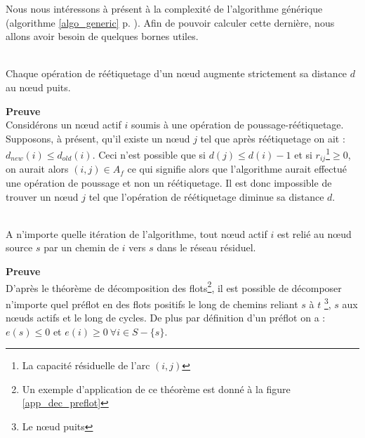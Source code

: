 Nous nous intéressons à présent à la complexité de l'algorithme générique (algorithme
\ref{algo_generic} p. \pageref{algo_generic}). Afin de pouvoir calculer cette dernière, nous allons
avoir besoin de quelques bornes utiles.

\begin{lemma} ~\\
	\label{increase_distance}
	Chaque opération de réétiquetage d'un n\oe ud augmente strictement sa distance $d$ au n\oe ud puits.
\end{lemma}

\textbf{Preuve} \\
Considérons un n\oe ud actif $i$ soumis à une opération de poussage-réétiquetage. Supposons, à présent,
qu'il existe un n\oe ud $j$ tel que après réétiquetage on ait : $d_{new}(i) \leq d_{old}(i)$. Ceci
n'est possible que si $d(j) \leq d(i) - 1$ et si $r_{ij}$\footnote{La capacité résiduelle de l'arc
$(i,j)$}$\geq 0$, on aurait alors $(i,j) \in A_f$ ce qui signifie alors que l'algorithme aurait
effectué une opération de poussage et non un réétiquetage. Il est donc impossible de trouver un
n\oe ud $j$ tel que l'opération de réétiquetage diminue sa distance $d$.

\begin{lemma} ~\\
	\label{residual_path}
	A n'importe quelle itération de l'algorithme, tout n\oe ud actif $i$ est relié au n\oe ud source $s$ par un
	chemin de $i$ vers $s$ dans le réseau résiduel.
\end{lemma}

\textbf{Preuve}\\
D'après le théorème de décomposition des flots\footnote{Un exemple d'application de ce théorème est
donné à la figure \ref{app_dec_preflot}}, il est possible de décomposer n'importe quel préflot
en des flots positifs le long de chemins reliant $s$ à $t$ \footnote{Le n\oe ud puits}, $s$ aux n\oe uds
actifs et le long de cycles. De plus par définition d'un préflot on a : $e(s) \leq 0$ et $e(i) \geq
0 \ \forall i \in S - \{s\}$.

